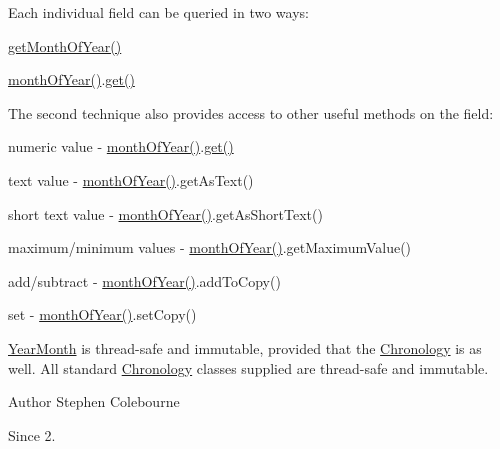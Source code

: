 Each individual field can be queried in two ways\-: 
\begin{DoxyItemize}
\item {\ttfamily \hyperlink{classorg_1_1joda_1_1time_1_1_year_month_a0b3bef0cf3e59a9af37b2b15e38baac8}{get\-Month\-Of\-Year()}} 
\item {\ttfamily \hyperlink{classorg_1_1joda_1_1time_1_1_year_month_a9c980b9a1d39f8d5dfdfe96fc983c0fb}{month\-Of\-Year()}.\hyperlink{interfaceorg_1_1joda_1_1time_1_1_readable_partial_a5844c779ac1ebd81281466fe2d23547a}{get()}} 
\end{DoxyItemize}The second technique also provides access to other useful methods on the field\-: 
\begin{DoxyItemize}
\item numeric value -\/ {\ttfamily \hyperlink{classorg_1_1joda_1_1time_1_1_year_month_a9c980b9a1d39f8d5dfdfe96fc983c0fb}{month\-Of\-Year()}.\hyperlink{interfaceorg_1_1joda_1_1time_1_1_readable_partial_a5844c779ac1ebd81281466fe2d23547a}{get()}} 
\item text value -\/ {\ttfamily \hyperlink{classorg_1_1joda_1_1time_1_1_year_month_a9c980b9a1d39f8d5dfdfe96fc983c0fb}{month\-Of\-Year()}.get\-As\-Text()} 
\item short text value -\/ {\ttfamily \hyperlink{classorg_1_1joda_1_1time_1_1_year_month_a9c980b9a1d39f8d5dfdfe96fc983c0fb}{month\-Of\-Year()}.get\-As\-Short\-Text()} 
\item maximum/minimum values -\/ {\ttfamily \hyperlink{classorg_1_1joda_1_1time_1_1_year_month_a9c980b9a1d39f8d5dfdfe96fc983c0fb}{month\-Of\-Year()}.get\-Maximum\-Value()} 
\item add/subtract -\/ {\ttfamily \hyperlink{classorg_1_1joda_1_1time_1_1_year_month_a9c980b9a1d39f8d5dfdfe96fc983c0fb}{month\-Of\-Year()}.add\-To\-Copy()} 
\item set -\/ {\ttfamily \hyperlink{classorg_1_1joda_1_1time_1_1_year_month_a9c980b9a1d39f8d5dfdfe96fc983c0fb}{month\-Of\-Year()}.set\-Copy()} 
\end{DoxyItemize}

\hyperlink{classorg_1_1joda_1_1time_1_1_year_month}{Year\-Month} is thread-\/safe and immutable, provided that the \hyperlink{classorg_1_1joda_1_1time_1_1_chronology}{Chronology} is as well. All standard \hyperlink{classorg_1_1joda_1_1time_1_1_chronology}{Chronology} classes supplied are thread-\/safe and immutable.

\begin{DoxyAuthor}{Author}
Stephen Colebourne 
\end{DoxyAuthor}
\begin{DoxySince}{Since}
2. 
\end{DoxySince}


